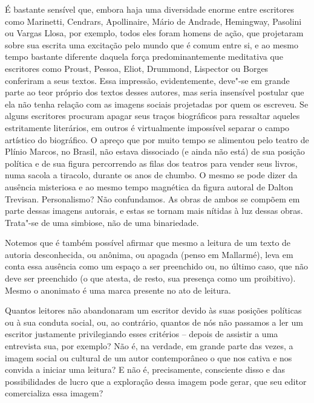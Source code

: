 É bastante sensível que, embora haja uma diversidade enorme entre
escritores como Marinetti, Cendrars, Apollinaire, Mário de Andrade, Hemingway, Pasolini ou Vargas Llosa, por exemplo, todos eles foram homens de ação, que projetaram sobre sua escrita uma excitação pelo
mundo que é comum entre si, e ao mesmo tempo bastante diferente daquela
força predominantemente meditativa que escritores como Proust, Pessoa,
Eliot, Drummond, Lispector ou Borges conferiram a seus textos. Essa impressão, evidentemente, deve"-se em grande parte ao teor próprio dos textos desses autores, mas seria insensível postular que ela não tenha
relação com as imagens sociais projetadas por quem os escreveu. Se
alguns escritores procuram apagar seus traços biográficos para ressaltar
aqueles estritamente literários, em outros é virtualmente impossível
separar o campo artístico do biográfico. O apreço que por muito tempo se
alimentou pelo teatro de Plínio Marcos, no Brasil, não estava dissociado
(e ainda não está) de sua posição política e de sua figura percorrendo
as filas dos teatros para vender seus livros, numa sacola a tiracolo,
durante os anos de chumbo. O mesmo se pode dizer da ausência misteriosa
e ao mesmo tempo magnética da figura autoral de Dalton Trevisan.
Personalismo? Não confundamos. As obras de ambos se compõem em parte
dessas imagens autorais, e estas se tornam mais nítidas à luz dessas
obras. Trata"-se de uma simbiose, não de uma binariedade.

Notemos que é também possível afirmar que mesmo a leitura de um texto de
autoria desconhecida, ou anônima, ou apagada (penso em Mallarmé), leva
em conta essa ausência como um espaço a ser preenchido ou, no último
caso, que não deve ser preenchido (o que atesta, de resto, sua presença
como um proibitivo). Mesmo o anonimato é uma marca presente no ato de
leitura.

Quantos leitores não abandonaram um escritor devido às suas posições
políticas ou à sua conduta social, ou, ao contrário, quantos de nós não
passamos a ler um escritor justamente privilegiando esses critérios --
depois de assistir a uma entrevista sua, por exemplo? Não é, na verdade,
em grande parte das vezes, a imagem social ou cultural de um autor
contemporâneo o que nos cativa e nos convida a iniciar uma leitura? E
não é, precisamente, consciente disso e das possibilidades de lucro que
a exploração dessa imagem pode gerar, que seu editor comercializa essa
imagem?

